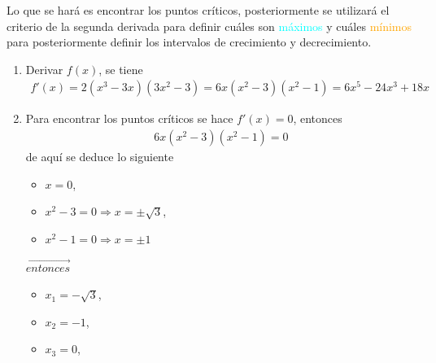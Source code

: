 \documentclass[legalpaper, 12pt]{exam}
\begin{document}
\begin{questions}
\begin{solution}
Lo que se hará es encontrar los puntos críticos, posteriormente se utilizará el criterio de la segunda derivada para definir cuáles son \textcolor{cyan}{máximos} y cuáles \textcolor{orange}{mínimos} para posteriormente definir los intervalos de crecimiento y decrecimiento.
\begin{enumerate}
    \item Derivar $f(x)$, se tiene
        \begin{align*}
        f'(x) = 2\left(x^3 - 3x\right)\left(3x^2 - 3\right) = 6x\left(x^2 - 3\right)\left(x^2 - 1\right) = 6x^5 - 24x^3 + 18x
        \end{align*}
    \item Para encontrar los puntos críticos se hace $f'(x) = 0$, entonces
        \begin{align*}
        6x\left(x^2 - 3\right)\left(x^2 - 1\right) = 0
        \end{align*}
        de aquí se deduce lo siguiente
        \begin{multicols}{3}
            \begin{itemize}
                \item $x=0$,
                \item $x^2 - 3 = 0 \Rightarrow x = \pm\sqrt{3}$,
                \item $x^2 - 1 = 0 \Rightarrow x = \pm 1$
            \end{itemize}\vspace*{1cm}
        \begin{center}
        \vspace*{\fill}
            $\overrightarrow{entonces}$
        \vspace*{\fill}
        \vspace*{1.29cm}
        \end{center}
            \begin{itemize}
                \item $x_1 = -\sqrt{3}$,
                \item $x_2 = -1$,
                \item $x_3 = 0$,

\end{itemize}
\end{multicols}
\end{enumerate}
\end{solution}
\end{questions}
\end{document}
